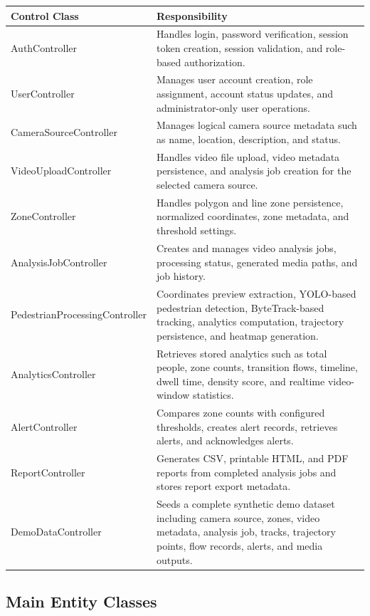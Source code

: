 \documentclass[12pt,a4paper]{report}
\begin{document}
\begin{longtable}{|p{4.2cm}|p{9.6cm}|}
\hline
\rowcolor{HeaderBlue}
\textbf{Control Class} & \textbf{Responsibility} \\
\hline
AuthController & Handles login, password verification, session token creation, session validation, and role-based authorization. \\
\hline
UserController & Manages user account creation, role assignment, account status updates, and administrator-only user operations. \\
\hline
CameraSourceController & Manages logical camera source metadata such as name, location, description, and status. \\
\hline
VideoUploadController & Handles video file upload, video metadata persistence, and analysis job creation for the selected camera source. \\
\hline
ZoneController & Handles polygon and line zone persistence, normalized coordinates, zone metadata, and threshold settings. \\
\hline
AnalysisJobController & Creates and manages video analysis jobs, processing status, generated media paths, and job history. \\
\hline
PedestrianProcessingController & Coordinates preview extraction, YOLO-based pedestrian detection, ByteTrack-based tracking, analytics computation, trajectory persistence, and heatmap generation. \\
\hline
AnalyticsController & Retrieves stored analytics such as total people, zone counts, transition flows, timeline, dwell time, density score, and realtime video-window statistics. \\
\hline
AlertController & Compares zone counts with configured thresholds, creates alert records, retrieves alerts, and acknowledges alerts. \\
\hline
ReportController & Generates CSV, printable HTML, and PDF reports from completed analysis jobs and stores report export metadata. \\
\hline
DemoDataController & Seeds a complete synthetic demo dataset including camera source, zones, video metadata, analysis job, tracks, trajectory points, flow records, alerts, and media outputs. \\
\hline
\end{longtable}

\subsection*{Main Entity Classes}
\end{document}
